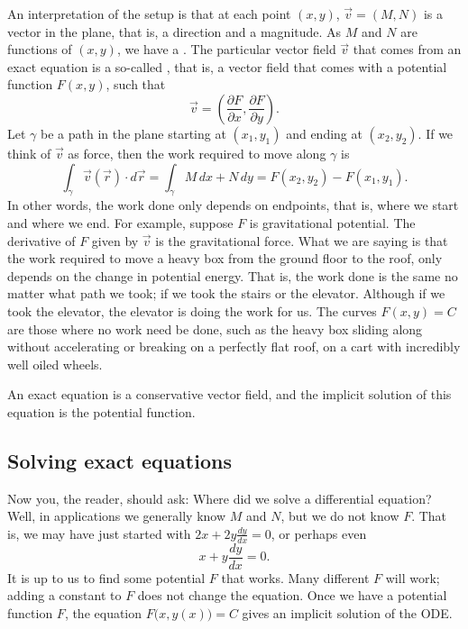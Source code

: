 An interpretation of the setup is that at each point $(x,y)$, $\vec{v} = (M,N)$ is
a vector in the plane, that is, a direction and a magnitude.
As $M$ and $N$ are functions of $(x,y)$, we have a \emph{}.  The particular 
vector field $\vec{v}$ that comes from an exact equation is a so-called
\emph{}, that is, a vector field that comes with a
potential function $F(x,y)$, such that
\begin{equation*}
\vec{v} = \left( \frac{\partial F}{\partial x} ,\frac{\partial F}{\partial
y} \right) .
\end{equation*}
Let
$\gamma$ be a path in the plane starting at $(x_1,y_1)$ and ending at
$(x_2,y_2)$.
If we think of $\vec{v}$ as force, then the work required to
move along $\gamma$ is
\begin{equation*}
\int_\gamma \vec{v}(\vec{r}) \cdot d\vec{r}
=
\int_\gamma M \, dx + N \, dy
=
F(x_2,y_2) - F(x_1,y_1) .
\end{equation*}
In other words, the work done only depends on endpoints, that is, where we start and
where we end.   For example, suppose $F$ is gravitational potential.  The
derivative of $F$ given by $\vec{v}$ is the gravitational force.
What we
are saying is that the work required to move a heavy box from the ground
floor to the roof, only depends on the change in potential energy.  That is,
the work done is the same
no matter what path we took; if we took the stairs or the elevator.
Although if we took the elevator, the elevator is doing the work for us.
The curves $F(x,y) = C$ are those where no work need be done, such as
the heavy box sliding along without accelerating or breaking on a perfectly
flat roof, on a cart with incredibly well oiled wheels.

An exact equation is a conservative vector field, and the implicit
solution of this equation is the potential function.

\subsection{Solving exact equations}

Now you, the reader, should ask: Where did we solve a differential equation?
Well, in applications we generally know $M$ and $N$, but we do not
know $F$.  That is, we may have just started with
$2x + 2y \frac{dy}{dx} = 0$, or perhaps even
\begin{equation*}
x + y \frac{dy}{dx} = 0 .
\end{equation*}
It is up to us to find some potential $F$ that works.  Many different $F$
will work; adding a constant to $F$ does not change the equation.
Once we have a potential function $F$, the equation 
$F\bigl(x,y(x)\bigr) = C$
gives an implicit solution of the ODE\@.


